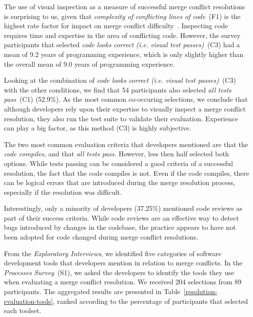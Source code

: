 The use of visual inspection as a measure of successful merge conflict resolutions is surprising to us, given that \textit{complexity of conflicting lines of code}~(F1) is the highest rate factor for impact on merge conflict difficulty~\cite{mckee2017software}.
Inspecting code requires time and expertise in the area of conflicting code.
However, the survey participants that selected \textit{code looks correct (i.e. visual test passes)}~(C3) had a mean of 9.2 years of programming experience, which is only slightly higher than the overall mean of 9.0 years of programming experience.

Looking at the combination of \textit{code looks correct (i.e. visual test passes)}~(C3) with the other conditions, we find that 54 participants also selected \textit{all tests pass}~(C1) (52.9\%).
As the most common co-occuring selections, we conclude that although developers rely upon their expertise to visually inspect a merge conflict resolution, they also run the test suite to validate their evaluation.
Experience can play a big factor, as this method (C3) is highly subjective.

The two most common evaluation criteria that developers mentioned are that the \emph{code compiles,} and that \emph{all tests pass.}
However, less then half selected both options.
While tests passing can be considered a good criteria of a successful resolution, the fact that the code compiles is not.
Even if the code compiles, there can be logical errors that are introduced during the merge resolution process, especially if the resolution was difficult.

Interestingly, only a minority of developers (37.25\%) mentioned code reviews as part of their success criteria.
While code reviews are an effective way to detect bugs introduced by changes in the codebase, the practice appears to have not been adopted for code changed during merge conflict resolutions.


From the \textit{Exploratory Interviews}, we identified five categories of software development tools that developers mention in relation to merge conflicts.
In the \textit{Processes Survey}~(S1), we asked the developers to identify the tools they use when evaluating a merge conflict resolution.
We received 204 selections from 89 participants.
The aggregated results are presented in Table~\ref{resolution-evaluation-tools}, ranked according to the percentage of participants that selected each toolset.

